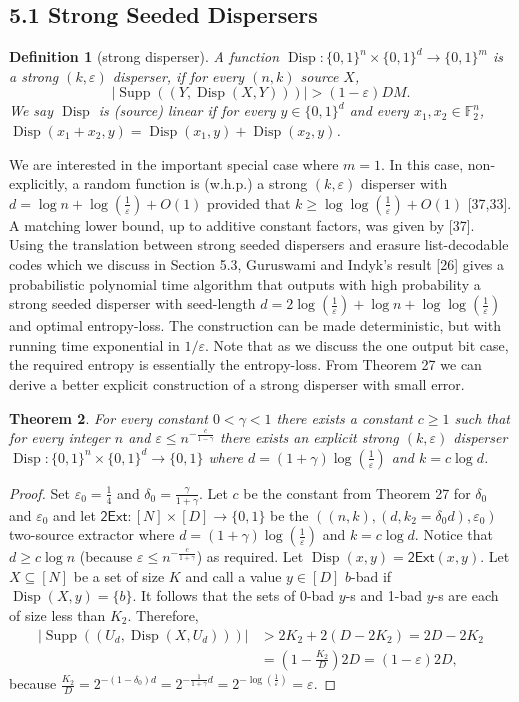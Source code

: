 \documentclass[10pt,a4paper]{article}
\newtheorem{theorem}{Theorem}
\newtheorem{definition}[theorem]{Definition}
\DeclareMathOperator{\Supp}{Supp}
\DeclareMathOperator{\Disp}{Disp}
\newcommand{\twoExt}{\mathsf{2Ext}}
\begin{document}
\subsection*{5.1 Strong Seeded Dispersers}
\begin{definition}[strong disperser]
A function $\Disp:\{0,1\}^n\times\{0,1\}^d\to\{0,1\}^m$ is a strong $(k,\varepsilon)$ disperser, if for every $(n,k)$ source $X$,
\[|\Supp((Y,\Disp(X,Y)))|>(1-\varepsilon)DM.\]
We say $\Disp$ is (source) linear if for every $y\in\{0,1\}^d$ and every $x_1,x_2\in\mathbb F_2^n$, $\Disp(x_1+x_2,y)=\Disp(x_1,y)+\Disp(x_2,y)$.
\end{definition}
We are interested in the important special case where $m=1$. In this case, non-explicitly, a random function is (w.h.p.) a strong $(k,\varepsilon)$ disperser with $d=\log n+\log(\frac1\varepsilon)+O(1)$ provided that $k\ge\log\log(\frac1\varepsilon)+O(1)$ [37,33]. A matching lower bound, up to additive constant factors, was given by [37].
Using the translation between strong seeded dispersers and erasure list-decodable codes which we discuss in Section 5.3, Guruswami and Indyk's result [26] gives a probabilistic polynomial time algorithm that outputs with high probability a strong seeded disperser with seed-length $d=2\log(\frac1\varepsilon)+\log n+\log\log(\frac1\varepsilon)$ and optimal entropy-loss. The construction can be made deterministic, but with running time exponential in $1/\varepsilon$.
Note that as we discuss the one output bit case, the required entropy is essentially the entropy-loss. From Theorem 27 we can derive a better explicit construction of a strong disperser with small error.
\begin{theorem}
For every constant $0<\gamma<1$ there exists a constant $c\ge1$ such that for every integer $n$ and $\varepsilon\le n^{-\frac c{1-\gamma}}$ there exists an explicit strong $(k,\varepsilon)$ disperser $\Disp:\{0,1\}^n\times\{0,1\}^d\to\{0,1\}$ where $d=(1+\gamma)\log(\frac1\varepsilon)$ and $k=c\log d$.
\end{theorem}
\begin{proof}
Set $\varepsilon_0=\frac14$ and $\delta_0=\frac\gamma{1+\gamma}$. Let $c$ be the constant from Theorem 27 for $\delta_0$ and $\varepsilon_0$ and let $\twoExt:[N]\times[D]\to\{0,1\}$ be the $((n,k),(d,k_2=\delta_0d),\varepsilon_0)$ two-source extractor where $d=(1+\gamma)\log(\frac1\varepsilon)$ and $k=c\log d$. Notice that $d\ge c\log n$ (because $\varepsilon\le n^{-\frac c{1+\gamma}}$) as required. Let $\Disp(x,y)=\twoExt(x,y)$.
Let $X\subseteq[N]$ be a set of size $K$ and call a value $y\in[D]$ $b$-bad if $\Disp(X,y)=\{b\}$. It follows that the sets of 0-bad $y$-s and 1-bad $y$-s are each of size less than $K_2$. Therefore,
\begin{align*}
|\Supp((U_d,\Disp(X,U_d)))|&>2K_2+2(D-2K_2)=2D-2K_2\\
&=\left(1-\frac{K_2}D\right)2D=(1-\varepsilon)2D,
\end{align*}
because $\frac{K_2}D=2^{-(1-\delta_0)d}=2^{-\frac1{1+\gamma}d}=2^{-\log(\frac1\varepsilon)}=\varepsilon$.
\end{proof}
\end{document}
